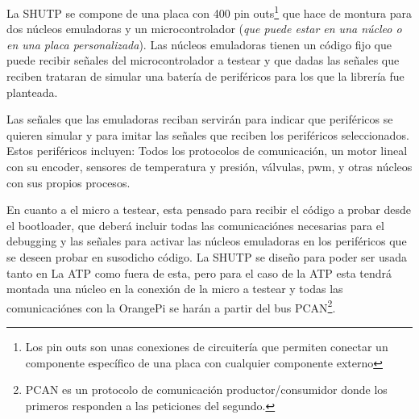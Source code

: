 \documentclass{report}
\begin{document}
La SHUTP se compone de una placa con 400 pin outs\footnote{Los pin outs son unas conexiones de circuitería que permiten conectar un componente específico de una placa con cualquier componente externo} que hace de montura para dos núcleos emuladoras y un microcontrolador (\textit{que puede estar en una núcleo o en una placa personalizada}). Las núcleos emuladoras tienen un código fijo que puede recibir señales del microcontrolador a testear y que dadas las señales que reciben trataran de simular una batería de periféricos para los que la librería fue planteada. \par
Las señales que las emuladoras reciban servirán para indicar que periféricos se quieren simular y para imitar las señales que reciben los periféricos seleccionados. Estos periféricos incluyen: Todos los protocolos de comunicación, un motor lineal con su encoder, sensores de temperatura y presión, válvulas, pwm, y otras núcleos con sus propios procesos. \par
En cuanto a el micro a testear, esta pensado para recibir el código a probar desde el bootloader, que deberá incluir todas las comunicaciónes necesarias para el debugging y las señales para activar las núcleos emuladoras en los periféricos que se deseen probar en susodicho código. La SHUTP se diseño para poder ser usada tanto en La ATP como fuera de esta, pero para el caso de la ATP esta tendrá montada una núcleo en la conexión de la micro a testear y todas las comunicaciónes con la OrangePi se harán a partir del bus PCAN\footnote{PCAN es un protocolo de comunicación productor/consumidor donde los primeros responden a las peticiones del segundo.}.
\par \vspace{0.3cm}
\end{document}
